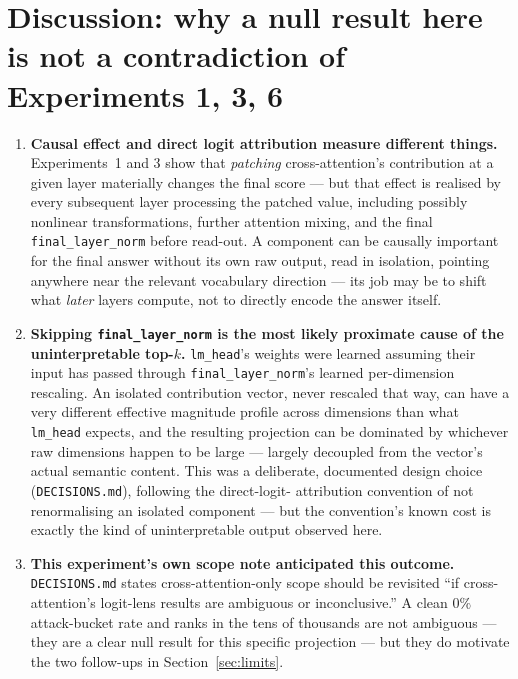 \documentclass[11pt]{article}
\begin{document}
\section{Discussion: why a null result here is not a contradiction of Experiments 1, 3, 6}
\label{sec:discussion}

\begin{enumerate}
  \item \textbf{Causal effect and direct logit attribution measure
  different things.} Experiments~1 and 3 show that \emph{patching}
  cross-attention's contribution at a given layer materially changes the
  final score — but that effect is realised by every subsequent layer
  processing the patched value, including possibly nonlinear
  transformations, further attention mixing, and the final
  \texttt{final\_layer\_norm} before read-out. A component can be causally
  important for the final answer without its own raw output, read in
  isolation, pointing anywhere near the relevant vocabulary direction —
  its job may be to shift what \emph{later} layers compute, not to
  directly encode the answer itself.
  \item \textbf{Skipping \texttt{final\_layer\_norm} is the most likely
  proximate cause of the uninterpretable top-$k$.} \texttt{lm\_head}'s
  weights were learned assuming their input has passed through
  \texttt{final\_layer\_norm}'s learned per-dimension rescaling. An
  isolated contribution vector, never rescaled that way, can have a very
  different effective magnitude profile across dimensions than what
  \texttt{lm\_head} expects, and the resulting projection can be dominated
  by whichever raw dimensions happen to be large — largely decoupled from
  the vector's actual semantic content. This was a deliberate, documented
  design choice (\texttt{DECISIONS.md}), following the direct-logit-
  attribution convention of not renormalising an isolated component — but
  the convention's known cost is exactly the kind of uninterpretable output
  observed here.
  \item \textbf{This experiment's own scope note anticipated this
  outcome.} \texttt{DECISIONS.md} states cross-attention-only scope should
  be revisited ``if cross-attention's logit-lens results are ambiguous or
  inconclusive.'' A clean $0\%$ attack-bucket rate and ranks in the tens of
  thousands are not ambiguous — they are a clear null result for this
  specific projection — but they do motivate the two follow-ups in
  Section~\ref{sec:limits}.
\end{enumerate}
\end{document}

